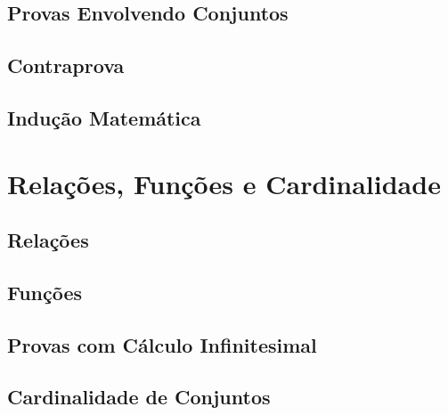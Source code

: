 \documentclass[a4paper,11pt]{book}
\theoremstyle{definition}
\theoremstyle{break}
\begin{document}
\chapter{Provas Envolvendo Conjuntos}

\chapter{Contraprova}

\chapter{Indução Matemática}


\part{Relações, Funções e Cardinalidade}

\chapter{Relações}

\chapter{Funções}

\chapter{Provas com Cálculo Infinitesimal}

\chapter{Cardinalidade de Conjuntos}
\end{document}
